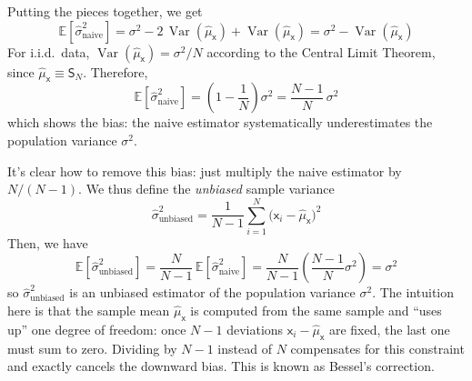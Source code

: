 Putting the pieces together, we get
\begin{equation}
    \mathbb{E}\!\left[\hat{\sigma}^{2}_{\text{naive}}\right] 
    = \sigma^2 - 2\,\operatorname{Var}(\hat{\mu}_{\mathsf{x}}) + \operatorname{Var}(\hat{\mu}_{\mathsf{x}})
    =\sigma^{2}-\operatorname{Var}(\hat{\mu}_{\mathsf{x}})
\end{equation}
For i.i.d.\ data, $\operatorname{Var}(\hat{\mu}_{\mathsf{x}})=\sigma^{2}/N$ according to the Central Limit Theorem, since $\hat \mu_\mathsf{x} \equiv \mathsf{S}_N$. Therefore,
\begin{equation}
    \mathbb{E}\!\left[\hat{\sigma}^{2}_{\text{naive}}\right]
    =\left(1-\frac{1}{N}\right)\sigma^{2}
    =\frac{N-1}{N}\,\sigma^{2}
\end{equation}
which shows the bias: the naive estimator systematically underestimates the population variance $\sigma^2$.

It's clear how to remove this bias: just multiply the naive estimator by $N/(N-1)$. We thus define the \emph{unbiased} sample variance
\begin{equation}
    \hat{\sigma}^{2}_{\text{unbiased}} = \frac{1}{N-1}\sum_{i=1}^{N}\bigl(\mathsf{x}_i-\hat{\mu}_{\mathsf{x}}\bigr)^{2}
\end{equation}
Then, we have
\begin{equation}
    \mathbb{E}[\hat{\sigma}^{2}_{\text{unbiased}}]
    =\frac{N}{N-1}\,\mathbb{E}\!\left[\hat{\sigma}^{2}_{\text{naive}}\right]
    =\frac{N}{N-1}\left(\frac{N-1}{N}\sigma^{2}\right)
    =\sigma^{2}
\end{equation}
so $\hat{\sigma}^{2}_{\text{unbiased}}$ is an unbiased estimator of the population variance $\sigma^{2}$. The intuition here is that the sample mean $\hat{\mu}_{\mathsf{x}}$ is computed from the same sample and ``uses up'' one degree of freedom: once $N-1$ deviations $\mathsf{x}_i-\hat{\mu}_{\mathsf{x}}$ are fixed, the last one must sum to zero. Dividing by $N-1$ instead of $N$ compensates for this constraint and exactly cancels the downward bias. This is known as Bessel's correction.

